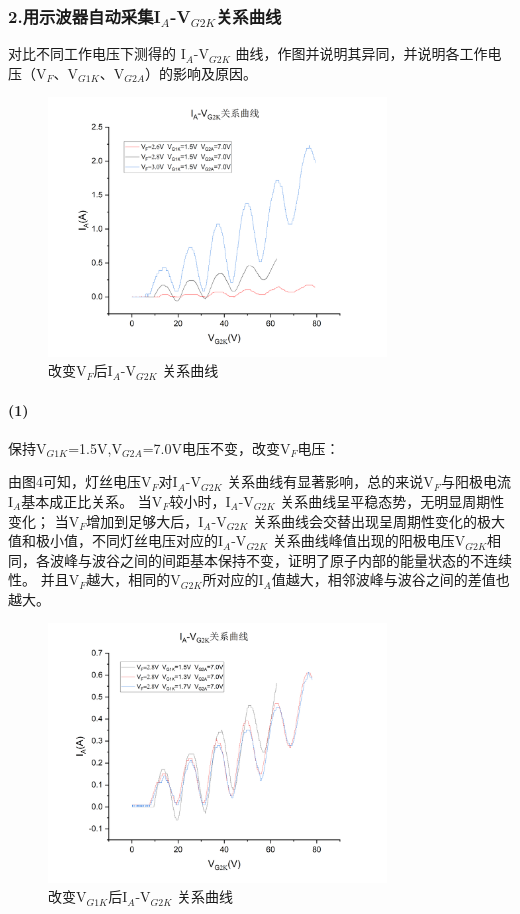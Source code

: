 \documentclass[12pt,a4paper,UTF8]{ctexart}
\begin{document}
	\subsubsection*{2.用示波器自动采集I$_{A}$-V$_{G2K}$关系曲线}
	
	对比不同工作电压下测得的 I$_{A}$-V$_{G2K}$ 曲线，作图并说明其异同，并说明各工作电压（V$_F$、V$_{G1K}$、V$_{G2A}$）的影响及原因。

	\begin{figure}[htbp]
		\centering
		\includegraphics[width=0.8\textwidth]{img/4.1.png}
		\caption{改变V$_F$后I$_{A}$-V$_{G2K}$ 关系曲线}
	\end{figure}

	\paragraph*{(1)}
	保持V$_{G1K}$=1.5V,V$_{G2A}$=7.0V电压不变，改变V$_F$电压：

	由图4可知，灯丝电压V$_F$对I$_{A}$-V$_{G2K}$ 关系曲线有显著影响，总的来说V$_F$与阳极电流I$_A$基本成正比关系。
	当V$_F$较小时，I$_{A}$-V$_{G2K}$ 关系曲线呈平稳态势，无明显周期性变化；
	当V$_F$增加到足够大后，I$_{A}$-V$_{G2K}$ 关系曲线会交替出现呈周期性变化的极大值和极小值，不同灯丝电压对应的I$_{A}$-V$_{G2K}$ 关系曲线峰值出现的阳极电压V$_{G2K}$相同，各波峰与波谷之间的间距基本保持不变，证明了原子内部的能量状态的不连续性。
	并且V$_F$越大，相同的V$_{G2K}$所对应的I$_A$值越大，相邻波峰与波谷之间的差值也越大。

	\begin{figure}[htbp]
		\centering
		\includegraphics[width=0.8\textwidth]{img/4.2.png}
		\caption{改变V$_{G1K}$后I$_{A}$-V$_{G2K}$ 关系曲线}
	\end{figure}
\end{document}
